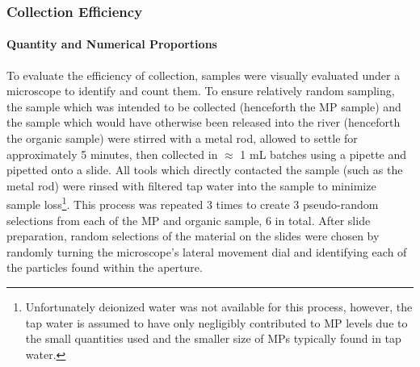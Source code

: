 \documentclass[fleqn,10pt]{SelfArx} %
\begin{document}
	\subsubsection{Collection Efficiency}
	\paragraph{Quantity and Numerical Proportions}
	To evaluate the efficiency of collection, samples were visually evaluated under a microscope to identify and count them. To ensure relatively random sampling, the sample which was intended to be collected (henceforth the MP sample) and the sample which would have otherwise been released into the river (henceforth the organic sample) were stirred with a metal rod, allowed to settle for approximately 5 minutes, then collected in $\approx$ 1 mL batches using a pipette and pipetted onto a slide. All tools which directly contacted the sample (such as the metal rod) were rinsed with filtered tap water into the sample to minimize sample loss\footnote{Unfortunately deionized water was not available for this process, however, the tap water is assumed to have only negligibly contributed to MP levels due to the small quantities used and the smaller size of MPs typically found in tap water.}. This process was repeated 3 times to create 3 pseudo-random selections from each of the MP and organic sample, 6 in total. After slide preparation, random selections of the material on the slides were chosen by randomly turning the microscope's lateral movement dial and identifying each of the particles found within the aperture. 
	
\end{document}
